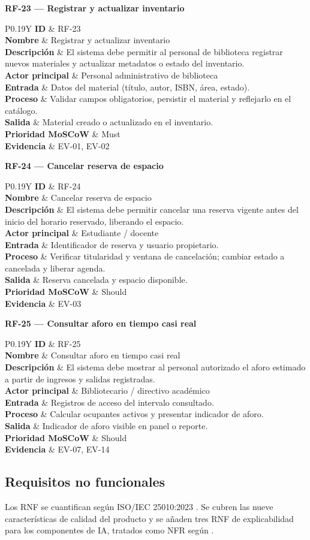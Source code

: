 \documentclass[12pt,journal,onecolumn]{IEEEtran}
\newcommand{\reqblock}[9]{%
\medskip\noindent\textbf{#1 --- #2}\par\smallskip
\begin{tabularx}{\textwidth}{P{0.19\textwidth}Y}\toprule
\textbf{ID} & #1\\
\textbf{Nombre} & #2\\
\textbf{Descripción} & #3\\
\textbf{Actor principal} & #4\\
\textbf{Entrada} & #5\\
\textbf{Proceso} & #6\\
\textbf{Salida} & #7\\
\textbf{Prioridad MoSCoW} & #8\\
\textbf{Evidencia} & #9\\\bottomrule
\end{tabularx}\par\medskip}
\begin{document}
\reqblock{RF-23}{Registrar y actualizar inventario}{El sistema debe permitir al personal de biblioteca registrar nuevos materiales y actualizar metadatos o estado del inventario.}{Personal administrativo de biblioteca}{Datos del material (título, autor, ISBN, área, estado).}{Validar campos obligatorios, persistir el material y reflejarlo en el catálogo.}{Material creado o actualizado en el inventario.}{Must}{EV-01, EV-02}
\reqblock{RF-24}{Cancelar reserva de espacio}{El sistema debe permitir cancelar una reserva vigente antes del inicio del horario reservado, liberando el espacio.}{Estudiante / docente}{Identificador de reserva y usuario propietario.}{Verificar titularidad y ventana de cancelación; cambiar estado a cancelada y liberar agenda.}{Reserva cancelada y espacio disponible.}{Should}{EV-03}
\reqblock{RF-25}{Consultar aforo en tiempo casi real}{El sistema debe mostrar al personal autorizado el aforo estimado a partir de ingresos y salidas registradas.}{Bibliotecario / directivo académico}{Registros de acceso del intervalo consultado.}{Calcular ocupantes activos y presentar indicador de aforo.}{Indicador de aforo visible en panel o reporte.}{Should}{EV-07, EV-14}

\subsection{Requisitos no funcionales}
Los RNF se cuantifican según ISO/IEC 25010:2023 \cite{iso25010_2023}. Se cubren las nueve características de calidad del producto y se añaden tres RNF de explicabilidad para los componentes de IA, tratados como NFR según \cite{chazette2020explainability,chazette2021exploring,chazette2022explainable}.
\end{document}

